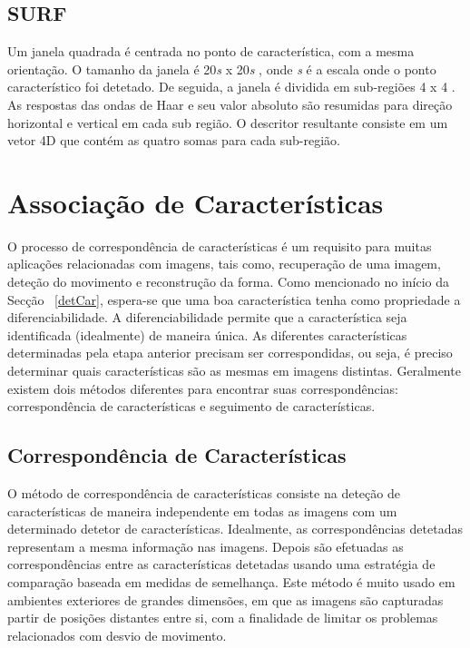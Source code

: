 \subsection{SURF}

Um janela quadrada é centrada no ponto de característica, com a mesma orientação. O tamanho da janela é 20\textit{s} x 20\textit{s} , onde \textit{s} é a escala onde o ponto característico foi detetado. De seguida, a janela é dividida em sub-regiões 4 x 4 . As respostas das ondas de Haar e seu valor absoluto são resumidas para direção horizontal e vertical em cada sub região. O descritor resultante consiste em um vetor 4D que contém as quatro somas para cada sub-região.


\section{Associação de Características}

O processo de correspondência de características é um requisito para muitas aplicações relacionadas com imagens, tais como, recuperação de uma imagem, deteção do movimento e reconstrução da forma. 
Como mencionado no início da Secção ~\ref{detCar}, espera-se que uma boa característica tenha como propriedade a diferenciabilidade. A diferenciabilidade permite que a característica seja identificada (idealmente) de maneira única.
As diferentes características determinadas pela etapa anterior precisam ser correspondidas, ou seja, é preciso determinar quais características são as mesmas em imagens distintas. Geralmente existem dois métodos diferentes para encontrar suas correspondências: correspondência de características e seguimento de características. 


\subsection{Correspondência de Características}

O método de correspondência de características consiste na deteção de características de maneira independente em todas as imagens com um determinado detetor de características.
Idealmente, as correspondências detetadas representam a mesma informação nas imagens.
Depois são efetuadas as correspondências entre as características detetadas usando uma estratégia de comparação baseada em medidas de semelhança.
Este método é muito usado em ambientes exteriores de grandes dimensões, em que as imagens são capturadas partir de posições distantes entre si, com a finalidade de limitar os problemas relacionados com desvio de movimento.

